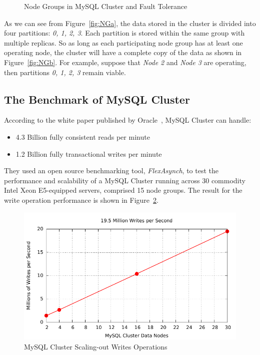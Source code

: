 \begin{figure}
	\caption{Node Groups in MySQL Cluster and Fault Tolerance \protect  \cite{mysqlclusterng}}
	\label{fig:mysqlclusterng}
\end{figure}

\noindent As we can see from Figure~\ref{fig:NGa}, the data stored in the cluster is divided into four partitions: \textit{0, 1, 2, 3}. Each partition is stored within the same group with multiple replicas. So as long as each participating node group has at least one operating node, the cluster will have a complete copy of the data as shown in Figure~\ref{fig:NGb}. For example, suppose that \textit{Node 2} and\textit{ Node 3} are operating, then partitions \textit{0, 1, 2, 3} remain viable.

\subsection{The Benchmark of MySQL Cluster}
According to the white paper published by Oracle~\cite{mysqlclusterwhitepaper}, MySQL Cluster can handle:
\begin{itemize}[noitemsep]
	\item 4.3 Billion fully consistent reads per minute
	\item 1.2 Billion fully transactional writes per minute
\end{itemize}

\noindent They used an open source benchmarking tool, \textit{FlexAsynch}, to test the performance and scalability of a MySQL Cluster running across 30 commodity Intel Xeon E5-equipped servers, comprised 15 node groups. The result for the write operation performance is shown in Figure~\ref{fig:mysqlwrite}.

\begin{figure}[h!]
	\centering
	\includegraphics[width=\linewidth]{figs/mysqlclusterbenchmark.pdf}
	\caption{MySQL Cluster Scaling-out Writes Operations}
	\label{fig:mysqlwrite}
\end{figure}

